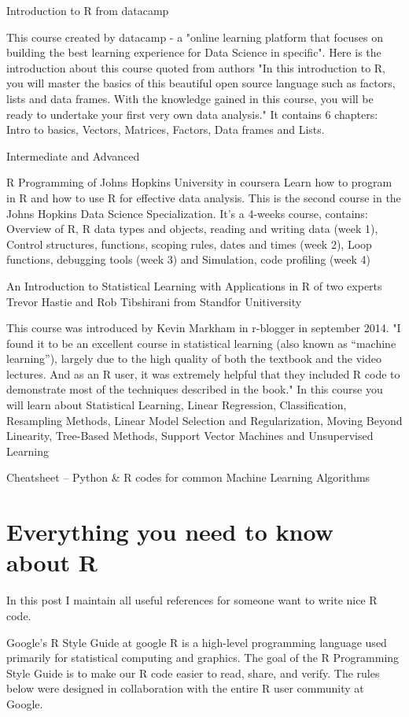Introduction to R from datacamp

This course created by datacamp - a "online learning platform that focuses on building the best learning experience for Data Science in specific". Here is the introduction about this course quoted from authors "In this introduction to R, you will master the basics of this beautiful open source language such as factors, lists and data frames. With the knowledge gained in this course, you will be ready to undertake your first very own data analysis." It contains 6 chapters: Intro to basics, Vectors, Matrices, Factors, Data frames and Lists.

Intermediate and Advanced

R Programming of Johns Hopkins University in coursera Learn how to program in R and how to use R for effective data analysis. This is the second course in the Johns Hopkins Data Science Specialization. It's a 4-weeks course, contains: Overview of R, R data types and objects, reading and writing data (week 1),  Control structures, functions, scoping rules, dates and times (week 2), Loop functions, debugging tools (week 3) and Simulation, code profiling (week 4)

An Introduction to Statistical Learning with Applications in R of two experts Trevor Hastie and Rob Tibshirani from Standfor Unitiversity

This course was introduced by Kevin Markham in r-blogger in september 2014. "I found it to be an excellent course in statistical learning (also known as “machine learning”), largely due to the high quality of both the textbook and the video lectures. And as an R user, it was extremely helpful that they included R code to demonstrate most of the techniques described in the book." In this course you will learn about Statistical Learning, Linear Regression, Classification, Resampling Methods, Linear Model Selection and Regularization, Moving Beyond Linearity, Tree-Based Methods, Support Vector Machines and Unsupervised Learning

Cheatsheet – Python & R codes for common Machine Learning Algorithms

\section{Everything you need to know about R}

In this post I maintain all useful references for someone want to write nice R code.

Google’s R Style Guide at google
R is a high-level programming language used primarily for statistical computing and graphics. The goal of the R Programming Style Guide is to make our R code easier to read, share, and verify. The rules below were designed in collaboration with the entire R user community at Google.


